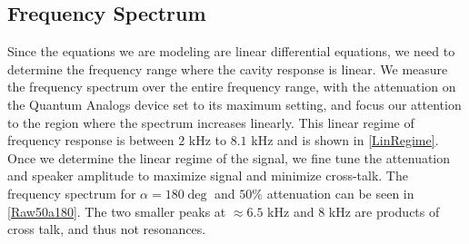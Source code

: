 \documentclass[12pt]{article}
\begin{document}
	\subsection{Frequency Spectrum}
	
	Since the equations we are modeling are linear differential equations, we need to determine the frequency range where the cavity response is linear. We measure the frequency spectrum over the entire frequency range, with the attenuation on the Quantum Analogs device set to its maximum setting, and focus our attention to the region where the spectrum increases linearly. This linear regime of frequency response is between $2$ kHz to $8.1$ kHz and is shown in \cref{LinRegime}. Once we determine the linear regime of the signal, we fine tune the attenuation and speaker amplitude to maximize signal and minimize cross-talk. The frequency spectrum for $\alpha = 180\deg$ and $50\%$ attenuation can be seen in \cref{Raw50a180}. The two smaller peaks at $\approx 6.5$ kHz and $8$ kHz are products of cross talk, and thus not resonances.
	
\end{document}
